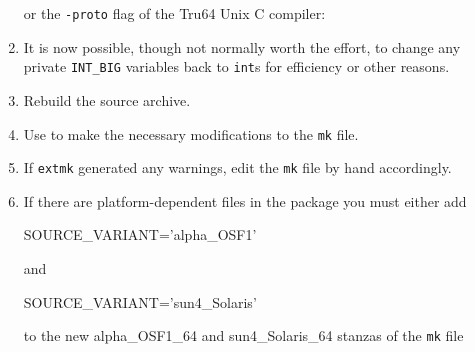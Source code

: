 \documentclass[twoside,11pt,nolof]{starlink}
\providecommand{\xroutine}[1]{\htmlref{\texttt{#1}}{#1}}
\providecommand{\file}[1]{\texttt{#1}}
\providecommand{\routine}[1]{\texttt{#1}}
\providecommand{\cc}[1]{\texttt{#1}}
\newenvironment{squote}{\begin{small}}{\end{small}}
\begin{document}
\begin{enumerate}
\begin{squote}
\begin{terminalv}
\end{terminalv}
\end{squote}
or the \texttt{-proto} flag of the Tru64 Unix C compiler:
\begin{squote}
\begin{terminalv}
\end{terminalv}
\end{squote}
%
\item
It is now possible, though not normally worth the effort,
to change any private \cc{INT\_BIG} variables back to \cc{int}s
for efficiency or other reasons.
%
\item
Rebuild the source archive.
\begin{squote}
\begin{terminalv}
\end{terminalv}
\end{squote}
%
\item
Use \xroutine{extmk} to make the necessary modifications to the \file{mk} file.
\begin{squote}
\begin{terminalv}
\end{terminalv}
\end{squote}
%
\item
If \routine{extmk} generated any warnings, edit the \file{mk} file by
hand accordingly.
%
\item
If there are platform-dependent files in the package you must either add
\begin{squote}
\begin{terminalv}
      SOURCE_VARIANT='alpha_OSF1'
\end{terminalv}
\end{squote}
and
\begin{squote}
\begin{terminalv}
      SOURCE_VARIANT='sun4_Solaris'
\end{terminalv}
\end{squote}
to the new alpha\_OSF1\_64 and sun4\_Solaris\_64 stanzas of the \file{mk} file

\end{enumerate}
\end{document}
